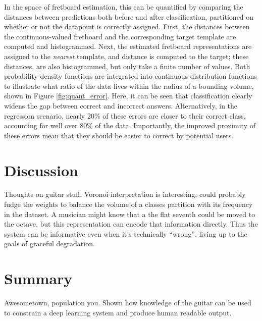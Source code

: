 In the space of fretboard estimation, this can be quantified by comparing the distances between predictions both before and after classification, partitioned on whether or not the datapoint is correctly assigned.
First, the distances between the continuous-valued fretboard and the corresponding target template are computed and histogrammed.
Next, the estimated fretboard representations are assigned to the \emph{nearest} template, and distance is computed to the target; these distances, are also histogrammed, but only take a finite number of values.
Both probability density functions are integrated into continuous distribution functions to illustrate what ratio of the data lives within the radius of a bounding volume, shown in Figure \ref{fig:quant_error}.
Here, it can be seen that classification clearly widens the gap between correct and incorrect answers.
Alternatively, in the regression scenario, nearly 20\% of these errors are closer to their correct class, accounting for well over 80\% of the data.
Importantly, the improved proximity of these errors mean that they should be easier to correct by potential users.


\section{Discussion}

Thoughts on guitar stuff.
Voronoi interpretation is interesting; could probably fudge the weights to balance the volume of a classes partition with its frequency in the dataset.
A musician might know that a the flat seventh could be moved to the octave, but this representation can encode that information directly.
Thus the system can be informative even when it's technically ``wrong'', living up to the goals of graceful degradation.

\section{Summary}

Awesometown, population you.
Shown how knowledge of the guitar can be used to constrain a deep learning system and produce human readable output.
